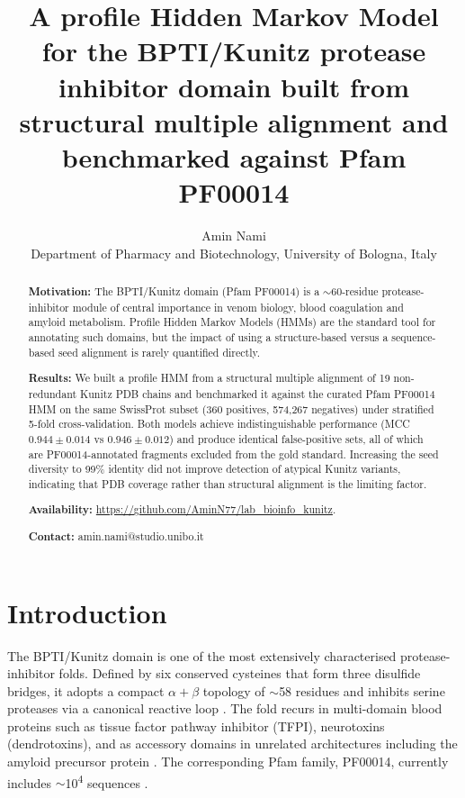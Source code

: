 \documentclass[11pt,a4paper]{article}
\title{\textbf{A profile Hidden Markov Model for the BPTI/Kunitz protease inhibitor domain built from structural multiple alignment and benchmarked against Pfam PF00014}}
\author{Amin Nami\\\small Department of Pharmacy and Biotechnology, University of Bologna, Italy}
\date{}
\begin{document}
\maketitle
\vspace{-1.5em}

\begin{abstract}
\noindent\textbf{Motivation:}
The BPTI/Kunitz domain (Pfam PF00014) is a $\sim$60-residue protease-inhibitor module of central importance in venom biology, blood coagulation and amyloid metabolism. Profile Hidden Markov Models (HMMs) are the standard tool for annotating such domains, but the impact of using a structure-based versus a sequence-based seed alignment is rarely quantified directly.

\noindent\textbf{Results:}
We built a profile HMM from a structural multiple alignment of 19 non-redundant Kunitz PDB chains and benchmarked it against the curated Pfam PF00014 HMM on the same SwissProt subset (360 positives, 574{,}267 negatives) under stratified 5-fold cross-validation. Both models achieve indistinguishable performance (MCC $0.944 \pm 0.014$ vs $0.946 \pm 0.012$) and produce identical false-positive sets, all of which are PF00014-annotated fragments excluded from the gold standard. Increasing the seed diversity to 99\% identity did not improve detection of atypical Kunitz variants, indicating that PDB coverage rather than structural alignment is the limiting factor.

\noindent\textbf{Availability:}
\url{https://github.com/AminN77/lab_bioinfo_kunitz}.

\noindent\textbf{Contact:} amin.nami@studio.unibo.it
\end{abstract}

\section{Introduction}
The BPTI/Kunitz domain is one of the most extensively characterised protease-inhibitor folds. Defined by six conserved cysteines that form three disulfide bridges, it adopts a compact $\alpha+\beta$ topology of $\sim$58 residues and inhibits serine proteases via a canonical reactive loop \citep{laskowski1980,ranasinghe2011}. The fold recurs in multi-domain blood proteins such as tissue factor pathway inhibitor (TFPI), neurotoxins (dendrotoxins), and as accessory domains in unrelated architectures including the amyloid precursor protein \citep{salvesen2013}. The corresponding Pfam family, PF00014, currently includes $\sim$10\textsuperscript{4} sequences \citep{mistry2021pfam}.
\end{document}
